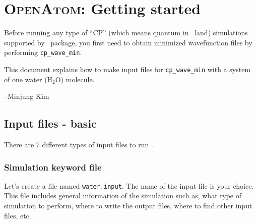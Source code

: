 %
%
%
%
%
%
%
%

\section{\textsc{OpenAtom}: Getting started}

Before running any type of ``CP'' (which means quantum in \openatom \ land) simulations supported by \openatom \ package, you first need to obtain minimized wavefunction files by performing \verb+cp_wave_min+.

This document explains how to make input files for \verb+cp_wave_min+ with a system of one water (H$_2$O) molecule.


--Minjung Kim



\subsection{Input files - basic}

There are 7 different types of input files to run \openatom. 

\subsubsection{Simulation keyword file}

Let's create a file named \verb+water.input+. The name of the input file is your choice. This file includes general information of the simulation such as, what  type of simulation to perform, where to write the output files, where to find other input files, etc. 

